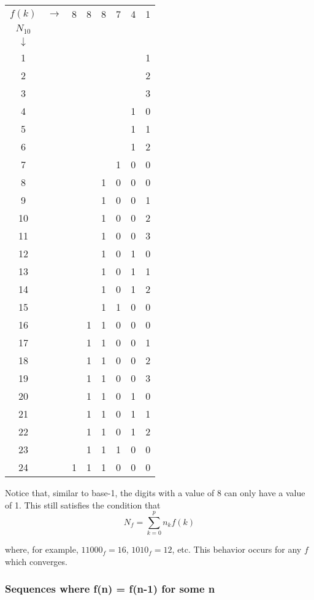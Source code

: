 \documentclass{article}
\begin{document}
\begin{center}
\begin{tabular} {c c c c c c c c}
$f(k)$ & $\rightarrow$ & 8 & 8 & 8 & 7 & 4 & 1\\
$N_{10}$\\
$\downarrow$\\
1 & & & & & & & 1\\
2 & & & & & & & 2\\
3 & & & & & & & 3\\
4 & & & & & & 1 & 0\\
5 & & & & & & 1 & 1\\
6 & & & & & & 1 & 2\\
7 & & & & & 1 & 0 & 0\\
8 & & & & 1 & 0 & 0 & 0\\
9 & & & & 1 & 0 & 0 & 1\\
10& & & & 1 & 0 & 0 & 2\\
11& & & & 1 & 0 & 0 & 3\\
12& & & & 1 & 0 & 1 & 0\\
13& & & & 1 & 0 & 1 & 1\\
14& & & & 1 & 0 & 1 & 2\\
15& & & & 1 & 1 & 0 & 0\\
16& & & 1 & 1 & 0 & 0 & 0\\
17& & & 1 & 1 & 0 & 0 & 1\\
18& & & 1 & 1 & 0 & 0 & 2\\
19& & & 1 & 1 & 0 & 0 & 3\\
20& & & 1 & 1 & 0 & 1 & 0\\
21& & & 1 & 1 & 0 & 1 & 1\\
22& & & 1 & 1 & 0 & 1 & 2\\
23& & & 1 & 1 & 1 & 0 & 0\\
24& & 1 & 1 & 1 & 0 & 0 & 0\\
\end{tabular}
\end{center}

\noindent Notice that, similar to base-1, the digits with a value of 8 can only have a value of 1. This still satisfies the condition that \begin{equation}N_f = \sum_{k=0}^{p} n_k f(k)\end{equation}

\noindent where, for example, $11000_f = 16$, $1010_f = 12$, etc. This behavior occurs for any $f$ which converges.

\subsubsection{Sequences where f(n) = f(n-1) for some n}
\end{document}
